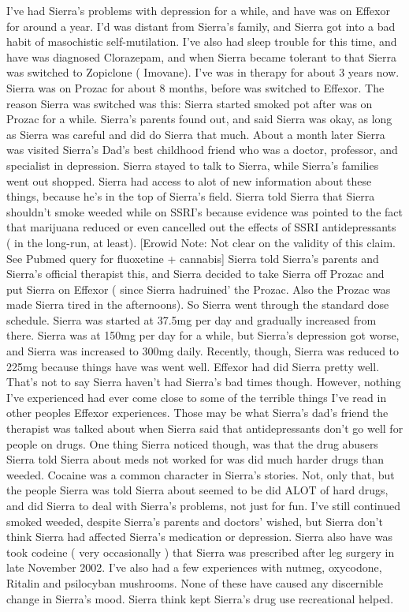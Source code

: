 \documentclass[12pt]{book}
\begin{document}
I've had Sierra's problems with depression for a while, and have was on Effexor for around a year. I'd was distant from Sierra's family, and Sierra got into a bad habit of masochistic self-mutilation. I've also had sleep trouble for this time, and have was diagnosed Clorazepam, and when Sierra became tolerant to that Sierra was switched to Zopiclone ( Imovane). I've was in therapy for about 3 years now. Sierra was on Prozac for about 8 months, before was switched to Effexor. The reason Sierra was switched was this: Sierra started smoked pot after was on Prozac for a while. Sierra's parents found out, and said Sierra was okay, as long as Sierra was careful and did do Sierra that much. About a month later Sierra was visited Sierra's Dad's best childhood friend who was a doctor, professor, and specialist in depression. Sierra stayed to talk to Sierra, while Sierra's families went out shopped. Sierra had access to alot of new information about these things, because he's in the top of Sierra's field. Sierra told Sierra that Sierra shouldn't smoke weeded while on SSRI's because evidence was pointed to the fact that marijuana reduced or even cancelled out the effects of SSRI antidepressants ( in the long-run, at least). [Erowid Note: Not clear on the validity of this claim. See Pubmed query for fluoxetine + cannabis] Sierra told Sierra's parents and Sierra's official therapist this, and Sierra decided to take Sierra off Prozac and put Sierra on Effexor ( since Sierra hadruined' the Prozac. Also the Prozac was made Sierra tired in the afternoons). So Sierra went through the standard dose schedule. Sierra was started at 37.5mg per day and gradually increased from there. Sierra was at 150mg per day for a while, but Sierra's depression got worse, and Sierra was increased to 300mg daily. Recently, though, Sierra was reduced to 225mg because things have was went well. Effexor had did Sierra pretty well. That's not to say Sierra haven't had Sierra's bad times though. However, nothing I've experienced had ever come close to some of the terrible things I've read in other peoples Effexor experiences. Those may be what Sierra's dad's friend the therapist was talked about when Sierra said that antidepressants don't go well for people on drugs. One thing Sierra noticed though, was that the drug abusers Sierra told Sierra about meds not worked for was did much harder drugs than weeded. Cocaine was a common character in Sierra's stories. Not, only that, but the people Sierra was told Sierra about seemed to be did ALOT of hard drugs, and did Sierra to deal with Sierra's problems, not just for fun. I've still continued smoked weeded, despite Sierra's parents and doctors' wished, but Sierra don't think Sierra had affected Sierra's medication or depression. Sierra also have was took codeine ( very occasionally ) that Sierra was prescribed after leg surgery in late November 2002. I've also had a few experiences with nutmeg, oxycodone, Ritalin and psilocyban mushrooms. None of these have caused any discernible change in Sierra's mood. Sierra think kept Sierra's drug use recreational helped.
\end{document}
